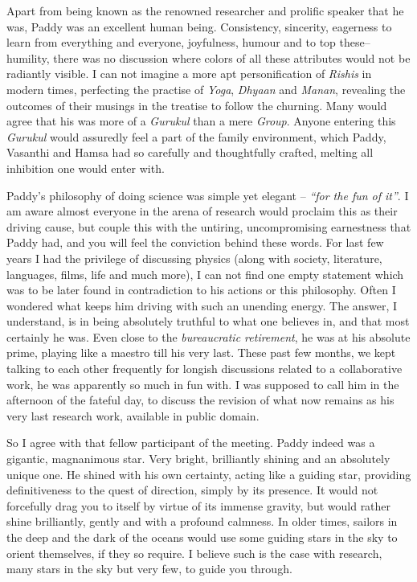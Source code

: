 \documentclass[prd, preprint, longbibliography, 11pt]{revtex4-1}
\begin{document}
Apart from being known as the renowned researcher and prolific speaker that he was,  Paddy was an excellent human being. Consistency, sincerity, eagerness to learn from everything and everyone, joyfulness, humour  and to top these-- humility, there was no discussion where colors of all these attributes would not be radiantly visible. I can not imagine a more apt personification of  \textit{Rishis} in modern times,  perfecting the practise of \textit{Yoga},  \textit{Dhyaan} and \textit{ Manan}, revealing the outcomes of their musings  in the treatise to follow the churning. Many would agree that his was more of a \textit{Gurukul} than a mere \textit{Group}. Anyone entering this \textit{Gurukul} would assuredly feel a part of the family environment,  which Paddy, Vasanthi and Hamsa had so carefully and thoughtfully crafted, melting all inhibition one would enter with.
 
Paddy's philosophy of doing science was simple yet elegant -- \textit{ ``for the fun of it''}. I am aware almost everyone in the arena of research would proclaim this as their driving cause, but couple this with the untiring, uncompromising earnestness that Paddy had, and you will feel the conviction behind these words. For last few years I had the privilege of discussing physics (along with society, literature, languages, films,  life and much more), I can not find one empty statement which was to be later found in contradiction to his actions or this philosophy. Often I wondered what keeps him driving with such an unending energy.  The answer, I understand, is in being absolutely truthful to what one believes in, and that most certainly he was. Even close to the \textit{bureaucratic retirement}, he was at his absolute prime, playing like a maestro till his very last. These past few months, we kept talking to each other frequently for longish discussions related to a collaborative work, he was apparently so much in fun with. I was supposed to call him in the afternoon of the fateful day, to discuss the revision of what now remains as his very last research work, available in  public domain. 


So I agree with that fellow participant of the meeting. Paddy indeed was a gigantic, magnanimous star. Very bright, brilliantly shining and  an absolutely unique one. He shined with his own certainty, acting like a guiding star, providing definitiveness to the quest of direction, simply by its presence. It would not forcefully drag you to itself by virtue of its immense gravity, but would rather shine brilliantly, gently and with a profound calmness.  In older times, sailors in the deep and the dark of the oceans would use  some guiding stars in the sky to orient themselves, if they so require. I believe such is the case with research, many stars in the sky but very few, to guide you through.
\end{document}
